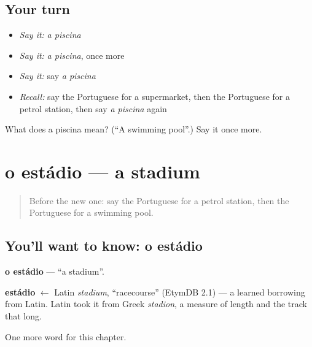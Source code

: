 \subsection*{Your turn}
\begin{itemize}
\raggedright
  \item \emph{Say it:} \emph{a piscina}
  \item \emph{Say it:} \emph{a piscina}, once more
  \item \emph{Say it:} say \emph{a piscina}
  \item \emph{Recall:} say the Portuguese for a supermarket, then the Portuguese for a petrol station, then say \emph{a piscina} again
\end{itemize}

\begin{tcolorbox}[breakable,colback=teal!4,colframe=teal!35!black,title={Before you move on}]
What does a piscina mean? (\textquotedblleft{}A swimming pool\textquotedblright{}.) Say it once more.
\end{tcolorbox}
\section[o estádio]{o estádio — a stadium}

\label{lesson:PT-C86-estadio}



\begin{quote}
Before the new one: say the Portuguese for a petrol station, then the Portuguese for a swimming pool.
\end{quote}

\subsection*{You'll want to know: o estádio}
\textbf{o estádio} — \textquotedblleft{}a stadium\textquotedblright{}.

\begin{cousinweb}
\textbf{estádio} $\leftarrow$ Latin \emph{stadium}, \textquotedblleft{}racecourse\textquotedblright{} (EtymDB 2.1) — a learned borrowing from Latin. Latin took it from Greek \emph{stadion}, a measure of length and the track that long.
\end{cousinweb}

\begin{grammarlens}[title={What you've built}]
One more word for this chapter.
\end{grammarlens}

